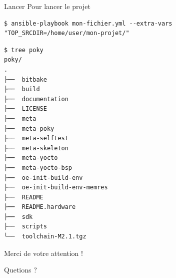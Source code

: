 \documentclass[compress]{smilebeamer}
\begin{document}
\begin{frame}[fragile]{Lancer}
Pour lancer le projet
\begin{lstlisting}[style=shell]
$ ansible-playbook mon-fichier.yml --extra-vars "TOP_SRCDIR=/home/user/mon-projet/"
\end{lstlisting}

\begin{lstlisting}[style=shell,basicstyle=\tiny\ttfamily\color{white}]
$ tree poky
poky/
.
├──  bitbake
├──  build
├──  documentation
├──  LICENSE
├──  meta
├──  meta-poky
├──  meta-selftest
├──  meta-skeleton
├──  meta-yocto
├──  meta-yocto-bsp
├──  oe-init-build-env
├──  oe-init-build-env-memres
├──  README
├──  README.hardware
├──  sdk
├──  scripts
└──  toolchain-M2.1.tgz
\end{lstlisting}
\end{frame}




\begin{frame}
\begin{center}
\huge{Merci de votre attention !}
\end{center}
\begin{center}
Quetions ?
\end{center}
\end{frame}
\end{document}
